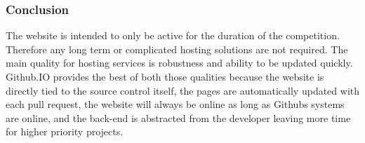 \documentclass[onecolumn, draftclsnofoot,10pt, compsoc]{IEEEtran}
\begin{document}
\subsubsection{Conclusion}
The website is intended to only be active for the duration of the competition. Therefore any long term or complicated hosting solutions are not required. The main quality for hosting services is robustness and ability to be updated quickly. Github.IO provides the best of both those qualities because the website is directly tied to the source control itself, the pages are automatically updated with each pull request, the website will always be online as long as Githubs systems are online, and the back-end is abstracted from the developer leaving more time for higher priority projects.

\nocite{*}%


\end{document}
